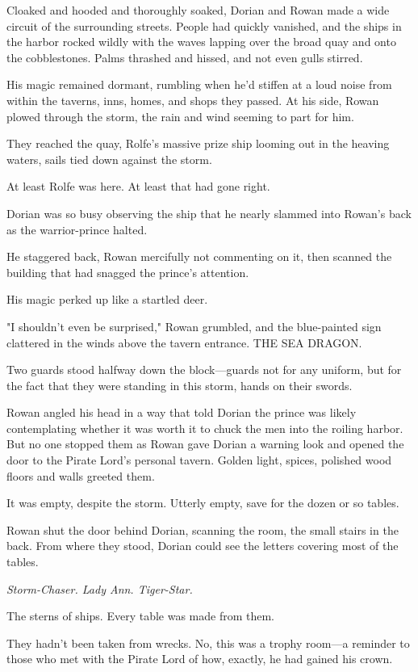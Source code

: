 Cloaked and hooded and thoroughly soaked, Dorian and Rowan made a wide circuit of the surrounding streets. People had quickly vanished, and the ships in the harbor rocked wildly with the waves lapping over the broad quay and onto the cobblestones. Palms thrashed and hissed, and not even gulls stirred.

His magic remained dormant, rumbling when he'd stiffen at a loud noise from within the taverns, inns, homes, and shops they passed. At his side, Rowan plowed through the storm, the rain and wind seeming to part for him.

They reached the quay, Rolfe's massive prize ship looming out in the heaving waters, sails tied down against the storm.

At least Rolfe was here. At least that had gone right.

Dorian was so busy observing the ship that he nearly slammed into Rowan's back as the warrior-prince halted.

He staggered back, Rowan mercifully not commenting on it, then scanned the building that had snagged the prince's attention.

His magic perked up like a startled deer.

"I shouldn't even be surprised," Rowan grumbled, and the blue-painted sign clattered in the winds above the tavern entrance. THE SEA DRAGON.

Two guards stood halfway down the block---guards not for any uniform, but for the fact that they were standing in this storm, hands on their swords.

Rowan angled his head in a way that told Dorian the prince was likely contemplating whether it was worth it to chuck the men into the roiling harbor. But no one stopped them as Rowan gave Dorian a warning look and opened the door to the Pirate Lord's personal tavern. Golden light, spices, polished wood floors and walls greeted them.

It was empty, despite the storm. Utterly empty, save for the dozen or so tables.

Rowan shut the door behind Dorian, scanning the room, the small stairs in the back. From where they stood, Dorian could see the letters covering most of the tables.

\emph{Storm-Chaser. Lady Ann. Tiger-Star.}

The sterns of ships. Every table was made from them.

They hadn't been taken from wrecks. No, this was a trophy room---a reminder to those who met with the Pirate Lord of how, exactly, he had gained his crown.

